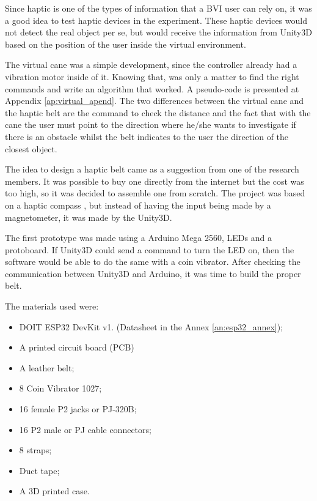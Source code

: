 Since haptic is one of the types of information that a BVI user can rely on, it was a good idea to test haptic devices in the experiment. These haptic devices would not detect the real object per se, but would receive the information from Unity3D based on the position of the user inside the virtual environment.
 
 The virtual cane was a simple development, since the controller already had a vibration motor inside of it. Knowing that, was only a matter to find the right commands and write an algorithm that worked. A pseudo-code is presented at Appendix \ref{ap:virtual_apend}. The two differences between the virtual cane and the haptic belt are the command to check the distance and the fact that with the cane the user must point to the direction where he/she wants to investigate if there is an obstacle whilst the belt indicates to the user the direction of the closest object.
 
 The idea to design a haptic belt came as a suggestion from one of the research members. It was possible to buy one directly from the internet but the cost was too high, so it was decided to assemble one from scratch. The project was based on a haptic compass \cite{kylecorry31_instructables_2020}, but instead of having the input being made by a magnetometer, it was made by the Unity3D.
 
 The first prototype was made using a Arduino Mega 2560, LEDs and a protoboard. If Unity3D could send a command to turn the LED on, then the software would be able to do the same with a coin vibrator. After checking the communication between Unity3D and Arduino, it was time to build the proper belt.
 
 The materials used were:
 \begin{itemize}
     \item DOIT ESP32 DevKit v1. (Datasheet in the Annex \ref{an:esp32_annex});
     \item A printed circuit board (PCB)
     \item A leather belt;
     \item 8 Coin Vibrator 1027;
     \item 16 female P2 jacks or PJ-320B;
     \item 16 P2 male or PJ cable connectors;
     \item 8 straps;
     \item Duct tape;
     \item A 3D printed case.
 \end{itemize}
 
